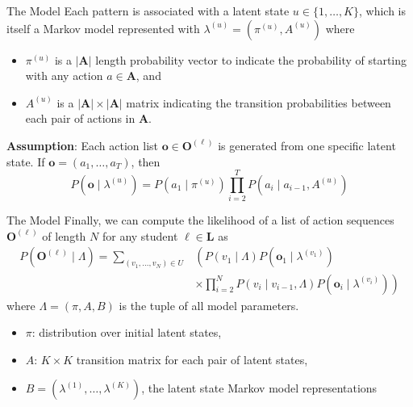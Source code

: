 \documentclass[10pt]{beamer}
\begin{document}
\begin{frame}{The Model}
  Each pattern is associated with a latent state $u \in \{1,\ldots,K\}$,
  which is itself a Markov model represented with $\lambda^{(u)} =
  (\pi^{(u)}, A^{(u)})$ where
  \begin{itemize}
    \item $\pi^{(u)}$ is a $|\mathbf{A}|$ length probability vector to
        indicate the probability of starting with any action $a \in
        \mathbf{A}$, and
    \item $A^{(u)}$ is a $|\mathbf{A}|\times|\mathbf{A}|$ matrix indicating
        the transition probabilities between each pair of actions in
        $\mathbf{A}$.
  \end{itemize}

  \textbf{Assumption}: Each action list $\mathbf{o} \in
  \mathbf{O}^{(\ell)}$ is generated from one specific latent state.
  If $\mathbf{o} = (a_1, \ldots, a_T)$, then
  \[
      P(\mathbf{o} \mid \lambda^{(u)})
      = P(a_1 \mid \pi^{(u)}) \prod_{i=2}^T P(a_i \mid a_{i-1}, A^{(u)})
  \]
\end{frame}

\begin{frame}{The Model}
  Finally, we can compute the likelihood of a list of action sequences
  $\mathbf{O}^{(\ell)}$ of length $N$ for any student $\ell \in \mathbf{L}$
  as
  \begin{align*}
      P(\mathbf{O}^{(\ell)} \mid \Lambda) = \sum_{(v_1,\ldots,v_N) \in U}
          &\left(P(v_1 \mid \Lambda) P(\mathbf{o}_1 \mid
          \lambda^{(v_1)})\phantom{\prod_{i}^N}\right.\\
          & \left.\times
          \prod_{i=2}^N P(v_i \mid v_{i-1}, \Lambda)P(\mathbf{o}_i \mid
      \lambda^{(v_i)})\right)
  \end{align*}
  where $\Lambda = (\pi, A, B)$ is the tuple of all model parameters.
  \begin{itemize}
    \item $\pi$: distribution over initial latent states,
    \item $A$: $K\times K$ transition matrix for each pair of latent
        states,
    \item $B = (\lambda^{(1)}, \ldots, \lambda^{(K)})$, the latent state
        Markov model representations
  \end{itemize}
\end{frame}
\end{document}
